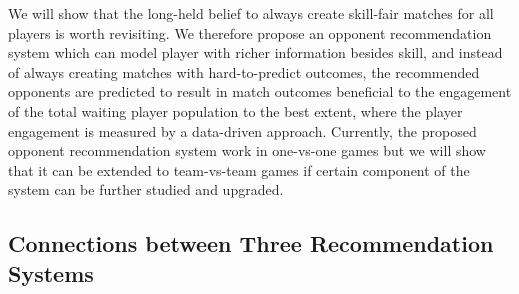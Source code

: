 We will show that the long-held belief to always create skill-fair matches for all players is worth revisiting. We therefore propose an opponent recommendation system which can model player with richer information besides skill, and instead of always creating matches with hard-to-predict outcomes, the recommended opponents are predicted to result in match outcomes beneficial to the engagement of the total waiting player population to the best extent, where the player engagement is measured by a data-driven approach. Currently, the proposed opponent recommendation system work in one-vs-one games but we will show that it can be extended to team-vs-team games if certain component of the system can be further studied and upgraded.  








\subsection{Connections between Three Recommendation Systems}

